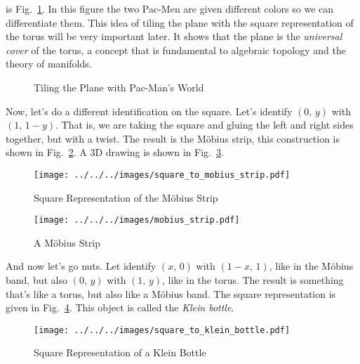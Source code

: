 \documentclass{article}
\theoremstyle{plain}
\theoremstyle{normal}
\begin{document}
        is Fig.~\ref{fig:plane_torus_pacman}. In this figure the two Pac-Men are
        given different colors so we can differentiate them. This idea of tiling
        the plane with the square representation of the torus will be very
        important later. It shows that the plane is the
        \textit{universal cover} of the torus, a concept that is fundamental
        to algebraic topology and the theory of manifolds.
        \begin{figure}
            \centering
            \caption{Tiling the Plane with Pac-Man's World}
            \label{fig:plane_torus_pacman}
        \end{figure}
        \par\hfill\par
        Now, let's do a different identification on the square. Let's identify
        $(0,\,y)$ with $(1,\,1-y)$. That is, we are taking the square and
        gluing the left and right sides together, but with a twist. The
        result is the M\"{o}bius strip, this construction is shown in
        Fig.~\ref{fig:square_to_mobius_strip}. A 3D drawing is shown in
        Fig.~\ref{fig:mobius_strip}.
        \begin{figure}
            \centering
            \texttt{[image: ../../../images/square\_to\_mobius\_strip.pdf]}
            \caption{Square Representation of the M\"{o}bius Strip}
            \label{fig:square_to_mobius_strip}
        \end{figure}
        \begin{figure}
            \centering
            \texttt{[image: ../../../images/mobius\_strip.pdf]}
            \caption{A M\"{o}bius Strip}
            \label{fig:mobius_strip}
        \end{figure}
        \par\hfill\par
        And now let's go nuts. Let identify
        $(x,\,0)$ with $(1-x,\,1)$, like in the M\"{o}bius band, but also
        $(0,\,y)$ with $(1,\,y)$, like in the torus. The result is something
        that's like a torus, but also like a M\"{o}bius band. The square
        representation is given in Fig.~\ref{fig:square_to_klein_bottle}.
        This object is called the \textit{Klein bottle}.
        \begin{figure}
            \centering
            \texttt{[image: ../../../images/square\_to\_klein\_bottle.pdf]}
            \caption{Square Representation of a Klein Bottle}
            \label{fig:square_to_klein_bottle}
        \end{figure}
\end{document}
